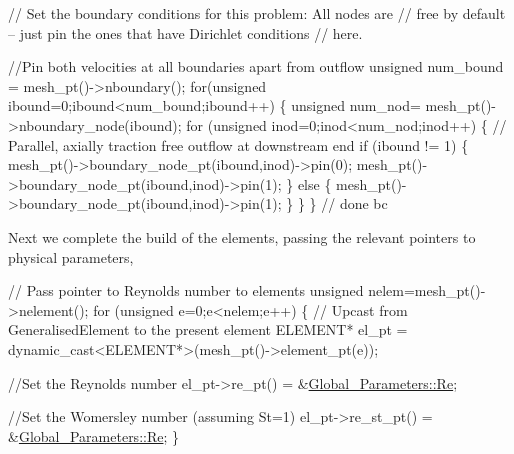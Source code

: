 \begin{DoxyCodeInclude}
  
 \textcolor{comment}{// Set the boundary conditions for this problem: All nodes are}
 \textcolor{comment}{// free by default -- just pin the ones that have Dirichlet conditions}
 \textcolor{comment}{// here. }
 
 \textcolor{comment}{//Pin both velocities at all boundaries apart from outflow}
 \textcolor{keywordtype}{unsigned} num\_bound = mesh\_pt()->nboundary();
 \textcolor{keywordflow}{for}(\textcolor{keywordtype}{unsigned} ibound=0;ibound<num\_bound;ibound++)
  \{
   \textcolor{keywordtype}{unsigned} num\_nod= mesh\_pt()->nboundary\_node(ibound);
   \textcolor{keywordflow}{for} (\textcolor{keywordtype}{unsigned} inod=0;inod<num\_nod;inod++)
    \{
     \textcolor{comment}{// Parallel, axially traction free outflow at downstream end}
     \textcolor{keywordflow}{if} (ibound != 1)
      \{
       mesh\_pt()->boundary\_node\_pt(ibound,inod)->pin(0);
       mesh\_pt()->boundary\_node\_pt(ibound,inod)->pin(1);
      \}
     \textcolor{keywordflow}{else}
      \{
       mesh\_pt()->boundary\_node\_pt(ibound,inod)->pin(1);
      \}
    \}
  \} \textcolor{comment}{// done bc}

\end{DoxyCodeInclude}


Next we complete the build of the elements, passing the relevant pointers to physical parameters,


\begin{DoxyCodeInclude}
  
  
  \textcolor{comment}{// Pass pointer to Reynolds number to elements}
  \textcolor{keywordtype}{unsigned} nelem=mesh\_pt()->nelement();
  \textcolor{keywordflow}{for} (\textcolor{keywordtype}{unsigned} e=0;e<nelem;e++)
   \{
    \textcolor{comment}{// Upcast from GeneralisedElement to the present element}
    ELEMENT* el\_pt = \textcolor{keyword}{dynamic\_cast<}ELEMENT*\textcolor{keyword}{>}(mesh\_pt()->element\_pt(e));
    
    \textcolor{comment}{//Set the Reynolds number}
    el\_pt->re\_pt() = &\hyperlink{namespaceGlobal__Parameters_a9d72e94a9305c6a310940a6a427ebe06}{Global\_Parameters::Re};   
    
    \textcolor{comment}{//Set the Womersley number (assuming St=1)}
    el\_pt->re\_st\_pt() = &\hyperlink{namespaceGlobal__Parameters_a9d72e94a9305c6a310940a6a427ebe06}{Global\_Parameters::Re};
   \}

\end{DoxyCodeInclude}



